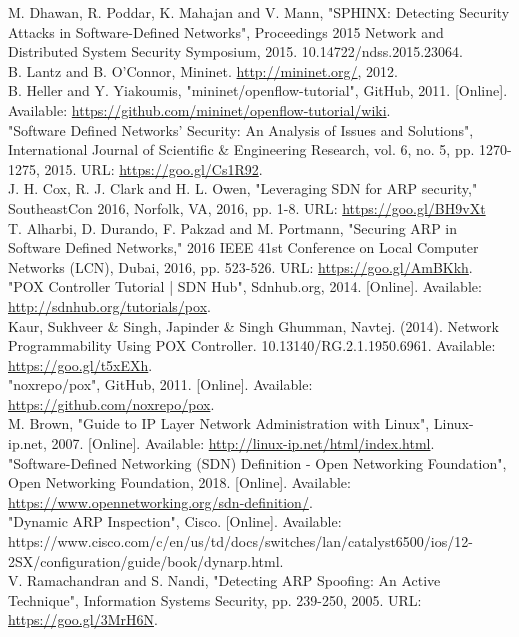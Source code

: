 \documentclass[conference]{IEEEtran}
\begin{document}
\begin{thebibliography}{00}
 M. Dhawan, R. Poddar, K. Mahajan and V. Mann, "SPHINX: Detecting Security Attacks in Software-Defined Networks", Proceedings 2015 Network and Distributed System Security Symposium, 2015. 10.14722/ndss.2015.23064.\\
 B. Lantz and B. O'Connor, Mininet. \url{http://mininet.org/}, 2012.\\
 B. Heller and Y. Yiakoumis, "mininet/openflow-tutorial", GitHub, 2011. [Online]. Available: \url{https://github.com/mininet/openflow-tutorial/wiki}.\\
 "Software Defined Networks' Security: An Analysis of Issues and Solutions", International Journal of Scientific \& Engineering Research, vol. 6, no. 5, pp. 1270-1275, 2015. URL: \url{https://goo.gl/Cs1R92}.\\
 J. H. Cox, R. J. Clark and H. L. Owen, "Leveraging SDN for ARP security," SoutheastCon 2016, Norfolk, VA, 2016, pp. 1-8. URL: \url{https://goo.gl/BH9vXt}\\
 T. Alharbi, D. Durando, F. Pakzad and M. Portmann, "Securing ARP in Software Defined Networks," 2016 IEEE 41st Conference on Local Computer Networks (LCN), Dubai, 2016, pp. 523-526. URL: \url{https://goo.gl/AmBKkh}.\\
 "POX Controller Tutorial | SDN Hub", Sdnhub.org, 2014. [Online]. Available: \url{http://sdnhub.org/tutorials/pox}.\\
 Kaur, Sukhveer \& Singh, Japinder \& Singh Ghumman, Navtej. (2014). Network Programmability Using POX Controller. 10.13140/RG.2.1.1950.6961. Available: \url{https://goo.gl/t5xEXh}.\\
 "noxrepo/pox", GitHub, 2011. [Online]. Available: \url{https://github.com/noxrepo/pox}.\\
 M. Brown, "Guide to IP Layer Network Administration with Linux", Linux-ip.net, 2007. [Online]. Available: \url{http://linux-ip.net/html/index.html}.\\
 "Software-Defined Networking (SDN) Definition - Open Networking Foundation", Open Networking Foundation, 2018. [Online]. Available: \url{https://www.opennetworking.org/sdn-definition/}.\\
 "Dynamic ARP Inspection", Cisco. [Online]. Available: https://www.cisco.com/c/en/us/td/docs/switches/lan/catalyst6500/ios/12-2SX/configuration/guide/book/dynarp.html.\\
 V. Ramachandran and S. Nandi, "Detecting ARP Spoofing: An Active Technique", Information Systems Security, pp. 239-250, 2005. URL: \url{https://goo.gl/3MrH6N}.
\end{thebibliography}
\end{document}
